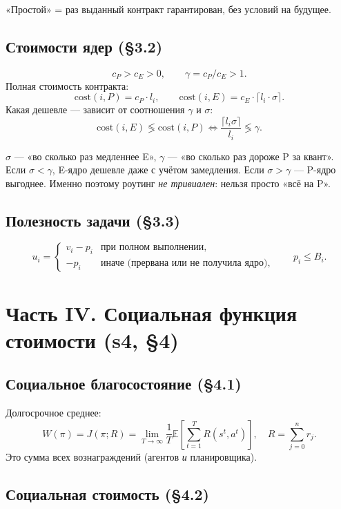\documentclass[11pt,a4paper]{article}
\begin{document}
«Простой» = раз выданный контракт гарантирован, без условий на будущее.

\subsection{Стоимости ядер (§3.2)}

\[
c_P > c_E > 0,\qquad \gamma = c_P/c_E > 1.
\]
Полная стоимость контракта:
\[
\mathrm{cost}(i,P) = c_P\cdot l_i,\qquad
\mathrm{cost}(i,E) = c_E\cdot\lceil l_i\cdot\sigma\rceil.
\]
Какая дешевле — зависит от соотношения $\gamma$ и $\sigma$:
\[
\mathrm{cost}(i,E) \lessgtr \mathrm{cost}(i,P)
\iff
\frac{\lceil l_i\sigma\rceil}{l_i} \lessgtr \gamma.
\]

\begin{why}
$\sigma$ — «во сколько раз медленнее E», $\gamma$ — «во сколько раз
дороже P за квант». Если $\sigma<\gamma$, E-ядро дешевле даже с учётом
замедления. Если $\sigma>\gamma$ — P-ядро выгоднее. Именно поэтому
роутинг \emph{не тривиален}: нельзя просто «всё на P».
\end{why}

\subsection{Полезность задачи (§3.3)}

\[
u_i = \begin{cases}
v_i - p_i & \text{при полном выполнении},\\
-p_i & \text{иначе (прервана или не получила ядро)},
\end{cases}
\qquad p_i \leq B_i.
\]

\section{Часть IV. Социальная функция стоимости (s4, §4)}

\subsection{Социальное благосостояние (§4.1)}

Долгосрочное среднее:
\[
W(\pi) = J(\pi;R) =
\lim_{T\to\infty}\frac{1}{T}\mathbb{E}\!\left[\sum_{t=1}^T R(s^t,a^t)\right],
\quad R=\sum_{j=0}^{n} r_j.
\]
Это сумма всех вознаграждений (агентов \emph{и} планировщика).

\subsection{Социальная стоимость (§4.2)}
\end{document}

